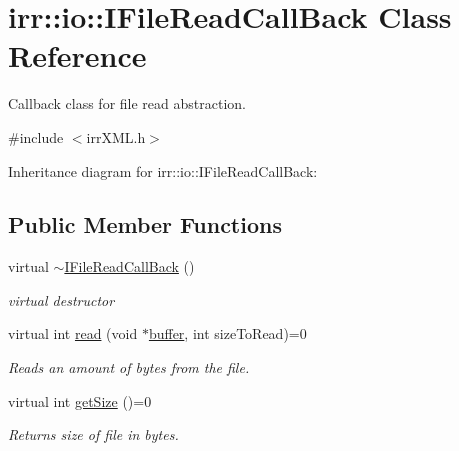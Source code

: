 \hypertarget{classirr_1_1io_1_1_i_file_read_call_back}{\section{irr\+:\+:io\+:\+:I\+File\+Read\+Call\+Back Class Reference}
\label{classirr_1_1io_1_1_i_file_read_call_back}
}


Callback class for file read abstraction.  




{\ttfamily \#include $<$irr\+X\+M\+L.\+h$>$}



Inheritance diagram for irr\+:\+:io\+:\+:I\+File\+Read\+Call\+Back\+:
\subsection*{Public Member Functions}
\begin{DoxyCompactItemize}
\item 
\hypertarget{classirr_1_1io_1_1_i_file_read_call_back_a91ace84f0a3966d88d78da5342eb9619}{virtual \hyperlink{classirr_1_1io_1_1_i_file_read_call_back_a91ace84f0a3966d88d78da5342eb9619}{$\sim$\+I\+File\+Read\+Call\+Back} ()}\label{classirr_1_1io_1_1_i_file_read_call_back_a91ace84f0a3966d88d78da5342eb9619}

\begin{DoxyCompactList}\small\item\em virtual destructor \end{DoxyCompactList}\item 
virtual int \hyperlink{classirr_1_1io_1_1_i_file_read_call_back_ae8c57b8454078aa2acd39772a6aa4439}{read} (void $\ast$\hyperlink{structbuffer}{buffer}, int size\+To\+Read)=0
\begin{DoxyCompactList}\small\item\em Reads an amount of bytes from the file. \end{DoxyCompactList}\item 
\hypertarget{classirr_1_1io_1_1_i_file_read_call_back_a51e3ae6f16cf3058800cb905f3b21b23}{virtual int \hyperlink{classirr_1_1io_1_1_i_file_read_call_back_a51e3ae6f16cf3058800cb905f3b21b23}{get\+Size} ()=0}\label{classirr_1_1io_1_1_i_file_read_call_back_a51e3ae6f16cf3058800cb905f3b21b23}

\begin{DoxyCompactList}\small\item\em Returns size of file in bytes. \end{DoxyCompactList}\end{DoxyCompactItemize}


